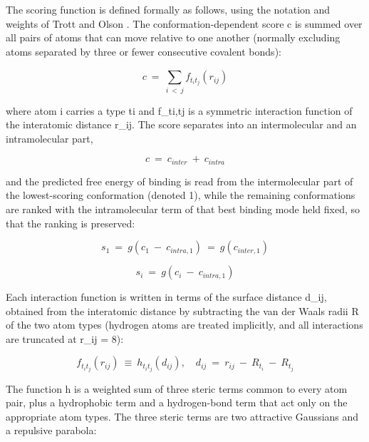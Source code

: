 The scoring function is defined formally as follows, using the notation and weights of Trott and Olson \cite{ref022}. The conformation-dependent score c is summed over all pairs of atoms that can move relative to one another (normally excluding atoms separated by three or fewer consecutive covalent bonds):

\begin{equation}
c\  = \ \sum_{i\  < \ j}^{}{f_{t_{i}t_{j}}\left( r_{ij} \right)}
\label{eq:vina-1}
\end{equation}

where atom i carries a type ti and f\_ti,tj is a symmetric interaction function of the interatomic distance r\_ij. The score separates into an intermolecular and an intramolecular part,

\begin{equation}
c\  = \ c_{inter}\  + \ c_{intra}
\label{eq:vina-2}
\end{equation}

and the predicted free energy of binding is read from the intermolecular part of the lowest-scoring conformation (denoted 1), while the remaining conformations are ranked with the intramolecular term of that best binding mode held fixed, so that the ranking is preserved:

\begin{equation}
s_{1}\  = \ g\left( c_{1}\  - \ c_{intra,1} \right)\  = \ g\left( c_{inter,1} \right)
\label{eq:vina-3}
\end{equation}

\begin{equation}
s_{i}\  = \ g\left( c_{i}\  - \ c_{intra,1} \right)
\label{eq:vina-4}
\end{equation}

Each interaction function is written in terms of the surface distance d\_ij, obtained from the interatomic distance by subtracting the van der Waals radii R of the two atom types (hydrogen atoms are treated implicitly, and all interactions are truncated at r\_ij = 8\angstrom{}):

\begin{equation}
f_{t_{i}t_{j}}\left( r_{ij} \right)\  \equiv \ h_{t_{i}t_{j}}\left( d_{ij} \right),\quad d_{ij}\  = \ r_{ij}\  - \ R_{t_{i}}\  - \ R_{t_{j}}
\label{eq:vina-5}
\end{equation}

The function h is a weighted sum of three steric terms common to every atom pair, plus a hydrophobic term and a hydrogen-bond term that act only on the appropriate atom types. The three steric terms are two attractive Gaussians and a repulsive parabola:

